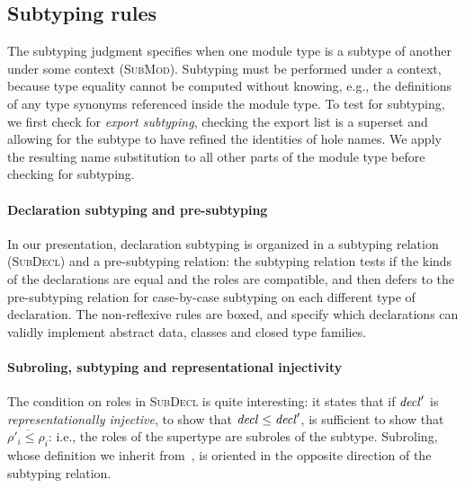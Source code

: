 
\subsection{Subtyping rules}
\label{sec:subtyping}




The subtyping judgment specifies when one module type
is a subtype of another under some context (\textsc{SubMod}).
Subtyping must be performed under a context, because type equality
cannot be computed without knowing, e.g., the definitions of any
type synonyms referenced inside the module type.  To test for
subtyping, we first check for \emph{export subtyping}, checking
the export list is a superset and allowing for the subtype to have
refined the identities of hole names.  We apply the resulting
name substitution to all other parts of the module type before
checking for subtyping.

\paragraph{Declaration subtyping and pre-subtyping}
In our presentation, declaration subtyping is organized in a subtyping
relation (\textsc{SubDecl}) and a pre-subtyping relation: the subtyping
relation tests if the kinds of the declarations are equal and the roles
are compatible, and then defers to the pre-subtyping relation for
case-by-case subtyping on each different type of declaration.  The
non-reflexive rules are boxed, and specify which declarations can
validly implement abstract data, classes and closed type families.

\paragraph{Subroling, subtyping and representational injectivity}
The condition on roles in \textsc{SubDecl} is quite interesting:
it states that if $\mathit{decl}'$ is \emph{representationally injective},
to show that $\mathit{decl} \le \mathit{decl}'$,
is sufficient to show that $\overline{\rho'_i \le \rho_i}$: i.e.,
the roles of the supertype are subroles of the subtype.
Subroling, whose definition we inherit from~\cite{Breitner:2014:SZC:2692915.2628141},
is oriented in the opposite direction of the subtyping relation.

